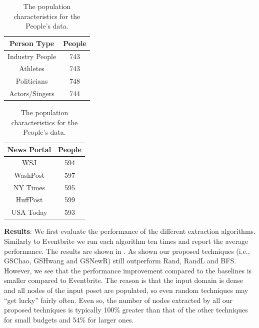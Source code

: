 \begin{table}
\scriptsize\center
\caption{The population characteristics for the People's data.}
\label{tab:ptypedata}
\begin{tabular}{|c|c|}
\hline
\textbf{Person Type} & \textbf{People} \\ \hline
Industry People & 743 \\
Athletes & 743 \\
Politicians & 748 \\
Actors/Singers & 744 \\ \hline
\end{tabular}
\quad
\begin{tabular}{|c|c|}
\hline
\textbf{News Portal} & \textbf{People} \\ \hline
WSJ & 594 \\
WashPost & 597 \\
NY Times & 595 \\
HuffPost & 599 \\
USA Today & 593 \\ \hline
\end{tabular}
\vspace{-15pt}
\end{table}


\vspace{5pt}\noindent\textbf{Results}: We first evaluate the performance of the different extraction algorithms. Similarly to Eventbrite we run each algorithm ten times and report the average performance. The results are shown in . As shown our proposed techniques (i.e., GSChao, GSHwang and GSNewR) still outperform Rand, RandL and BFS. However, we see that the performance improvement compared to the baselines is smaller compared to Eventbrite. The reason is that the input domain is dense and all nodes of the input poset are populated, so even random techniques may ``get lucky'' fairly often. Even so, the number of nodes extracted by all our proposed techniques is typically 100\% greater than that of the other techniques for small budgets and 54\% for larger ones.

